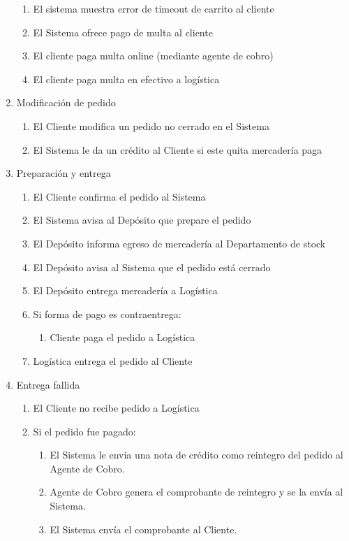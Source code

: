 \begin{enumerate}
\begin{enumerate}
    \item El sistema muestra error de timeout de carrito al cliente \label{itm:f-sistema-error-timeout-cliente}
    \item El Sistema ofrece pago de multa al cliente \label{itm:f-sistema-ofrece-multa-cliente}
    \item El cliente paga multa online (mediante agente de cobro) \label{itm:f-cliente-paga-multa-agentecobro}
    \item El cliente paga multa en efectivo a logística \label{itm:f-cliente-paga-multa-logistica}
  \end{enumerate}
  
\item Modificación de pedido
  \begin{enumerate}
    \item El Cliente modifica un pedido no cerrado en el Sistema
    \item El Sistema le da un crédito al Cliente si este quita mercadería paga
  \end{enumerate}

\item Preparación y entrega
  \begin{enumerate}
    \item El Cliente confirma el pedido al Sistema
    \item El Sistema avisa al Depósito que prepare el pedido 
    \item El Depósito informa egreso de mercadería al Departamento de stock
    \item El Depósito avisa al Sistema que el pedido está cerrado
    \item El Depósito entrega mercadería a Logística
    \item Si forma de pago es contraentrega: 
    \begin{enumerate}
      \item Cliente paga el pedido a Logística
    \end{enumerate}
    \item Logística entrega el pedido al Cliente
  \end{enumerate}

\item Entrega fallida
  \begin{enumerate}
    \item El Cliente no recibe pedido a Logística
    \item Si el pedido fue pagado:
    \begin{enumerate}
      \item El Sistema le envía una nota de crédito como reintegro del pedido al Agente de Cobro. 
      \item Agente de Cobro genera el comprobante de reintegro y se la envía al Sistema.
      \item El Sistema envía el comprobante al Cliente. 
    \end{enumerate}


\end{enumerate}
\end{enumerate}
